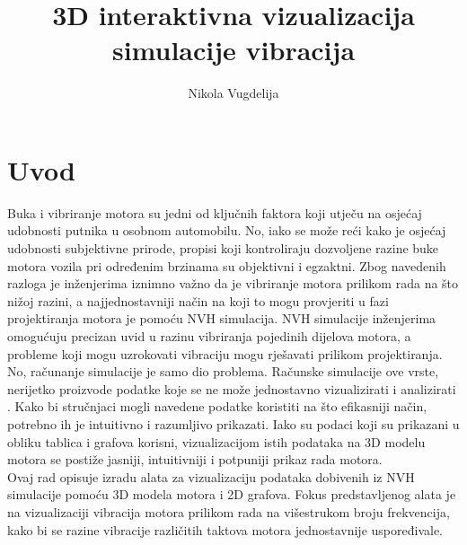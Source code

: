 \documentclass[times, utf8, diplomski]{fer}
\begin{document}

\title{3D interaktivna vizualizacija simulacije vibracija}

\author{Nikola Vugdelija}

\maketitle





\tableofcontents

\listoffigures

\chapter{Uvod}
Buka i vibriranje motora su jedni od ključnih faktora koji utječu na osjećaj udobnosti putnika u osobnom automobilu. No, iako se može reći kako je osjećaj udobnosti subjektivne prirode, propisi koji kontroliraju dozvoljene razine buke motora vozila pri određenim brzinama su objektivni i egzaktni. Zbog navedenih razloga je inženjerima iznimno važno da je vibriranje motora prilikom rada na što nižoj razini, a najjednostavniji način na koji to mogu provjeriti u fazi projektiranja motora je pomoću NVH  simulacija. NVH simulacije inženjerima omogućuju precizan uvid u razinu vibriranja pojedinih dijelova motora, a probleme koji mogu uzrokovati vibraciju mogu rješavati prilikom projektiranja.\\

No, računanje simulacije je samo dio problema. Računske simulacije ove vrste, nerijetko proizvode podatke koje se ne može jednostavno vizualizirati i analizirati \citep{matkovic2021getting}. Kako bi stručnjaci mogli navedene podatke koristiti na što efikasniji način, potrebno ih je intuitivno i razumljivo prikazati. Iako su podaci koji su prikazani u obliku tablica i grafova korisni, vizualizacijom istih podataka na 3D modelu motora se postiže jasniji, intuitivniji i potpuniji prikaz rada motora.\\

Ovaj rad opisuje izradu alata za vizualizaciju podataka dobivenih iz NVH simulacije pomoću 3D modela motora i 2D grafova. Fokus predstavljenog alata je na vizualizaciji vibracija motora prilikom rada na višestrukom broju frekvencija, kako bi se razine vibracije različitih taktova motora jednostavnije uspoređivale.
\end{document}
